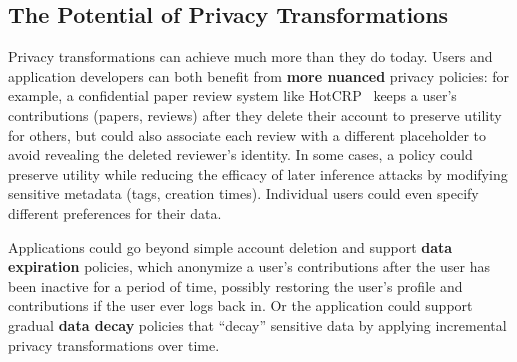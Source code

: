 %
%

\subsection{The Potential of Privacy Transformations}
Privacy transformations can achieve much more than they do today.
%
Users and application developers can both benefit from \textbf{more nuanced} privacy policies:
%
for example, a confidential paper review system like HotCRP~\cite{hotcrp} keeps a user's
contributions (papers, reviews) after they delete their account to preserve utility for others, but
could also associate each review with a different placeholder to avoid revealing the deleted
reviewer's identity.
%
In some cases, a policy could preserve utility while reducing the efficacy of later inference
attacks by \eg modifying sensitive metadata (\eg tags, creation times).
%
%
%
Individual users could even specify different preferences for their data.
%
%

%
Applications could go beyond simple account deletion and support \textbf{data
expiration} policies, which anonymize a user's contributions after the user has been inactive for a
period of time, possibly restoring the user's profile and contributions if the user ever logs back
in.
%
Or the application could support gradual \textbf{data decay} policies that ``decay'' sensitive data
by applying incremental privacy transformations over time.

